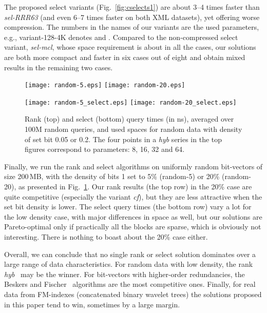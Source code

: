 \documentclass{llncs}
\begin{document}
The proposed select variants (Fig.~\ref{fig:cselects1}) 
are about 3--4 times faster than {\em sel-RRR63} (and even 6--7 times faster 
on both XML datasets), yet offering worse compression. 
The numbers in the names of our variants are the used parameters, e.g.,
variant-128-4K denotes  and .
Compared to the non-compressed select variant, {\em sel-mcl}, 
whose space requirement is about  in all the cases, 
our solutions are both more compact and faster in six cases out of eight 
and obtain mixed results in the remaining two cases.


\begin{figure}
\centerline{
\texttt{[image: random-5.eps]}
\texttt{[image: random-20.eps]}
}
\centerline{
\texttt{[image: random-5\_select.eps]}
\texttt{[image: random-20\_select.eps]}
}
\caption[Results]
{Rank (top) and select (bottom) query times (in ns), 
averaged over 100M random queries, and used spaces for random data 
with density of set bit 0.05 or 0.2.
The four points in a {\em hyb} series in the top figures 
correspond to parameters: 8, 16, 32 and 64.
}
\label{fig:cranks_cselects_random}
\end{figure}


Finally, we run the rank and select algorithms on 
uniformly random bit-vectors of size 200\,MB, 
with the density of bits 1 set to 5\% (random-5) or 20\% (random-20), 
as presented in Fig.~\ref{fig:cranks_cselects_random}.
Our rank results (the top row) in the 20\% case are quite competitive 
(especially the variant {\em cf}), but they are less 
attractive when the set bit density is lower.
The select query times (the bottom row)
vary a lot for the low density case, with major differences in space as well, 
but our solutions are Pareto-optimal only if 
practically all the blocks are sparse, which is obviously not interesting.
There is nothing to boast about the 20\% case either.


Overall, we can conclude that no single rank or select solution 
dominates over a large range of data characteristics.
For random data with low density, the rank {\em hyb}~\cite{KKP14} 
may be the winner. 
For bit-vectors with higher-order redundancies, 
the Beskers and Fischer~\cite{BF14} algorithms are the most competitive ones.
Finally, for real data from FM-indexes (concatenated binary wavelet trees) 
the solutions proposed in this paper tend to win, 
sometimes by a large margin.
\end{document}
